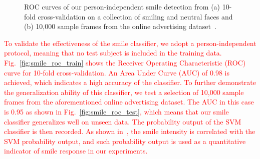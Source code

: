 \documentclass[twoside,leqno,twocolumn]{article}
\newcommand{\Songfan}[1]{\textcolor{red}{#1}}
\begin{document}
\begin{figure}[h]
\centering
\caption{ROC curves of our person-independent smile detection from (a) 10-fold cross-validation on a collection of smiling and neutral faces and (b) 10,000 sample frames from the online advertising dataset~\cite{Yang_FG15}.}
\end{figure}


\Songfan{To validate the effectiveness of the smile classifier, we adopt a person-independent protocol, meaning that no test subject is included in the training data. Fig.~\ref{fig:smile_roc_train} shows the Receiver Operating Characteristic (ROC) curve for 10-fold cross-validation. An Area Under Curve (AUC) of 0.98 is achieved, which indicates a high accuracy of the classifier. To further demonstrate the generalization ability of this classifier, we test a selection of 10,000 sample frames from the aforementioned online advertising dataset. The AUC in this case is 0.95 as shown in Fig.~\ref{fig:smile_roc_test}, which means that our smile classifier generalizes well on unseen data. The probability output of the SVM classifier is then recorded. As shown in~\cite{Yang_TAC14}, the smile intensity is correlated with the SVM probability output, and such probability output is used as a quantitative indicator of smile response in our experiments.}
\end{document}
